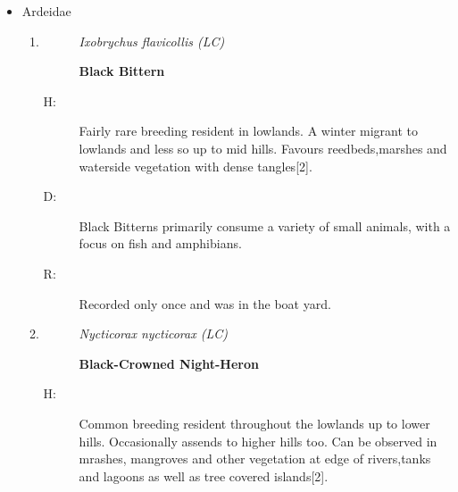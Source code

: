 \begin{itemize}
\begin{enumerate}
\begin{description}
\item[R: ]%
Surrounding woody areas of the university playground%
\end{description}%
\item%
\begin{description}%
\item[]%
\textit{ Apus affinis (LC)}%
\item[]%
\textbf{Little Swift/House Swift}%
\end{description}%
\begin{description}%
\item[H: ]%
Fairly common breeding resident rather locally from lowlands up to high hills{[}2{]}.%
\item[D: ]%
Diet mainly consists of flying insects.%
\item[R: ]%
Observed in flight near ENTC Building.%
\end{description}%
\end{enumerate}%
\item%
Ardeidae%
\begin{enumerate}%
\item%
\begin{description}%
\item[]%
\textit{Ixobrychus flavicollis (LC)}%
\item[]%
\textbf{Black Bittern}%
\end{description}%
\begin{description}%
\item[H: ]%
Fairly rare breeding resident in lowlands. A winter migrant to lowlands and less so up to mid hills. Favours reedbeds,marshes and waterside vegetation with dense tangles{[}2{]}.%
\item[D: ]%
Black Bitterns primarily consume a variety of small animals, with a focus on fish and amphibians.%
\item[R: ]%
Recorded only once and was in the boat yard.%
\end{description}%
\item%
\begin{description}%
\item[]%
\textit{Nycticorax nycticorax (LC)}%
\item[]%
\textbf{Black{-}Crowned Night{-}Heron}%
\end{description}%
\begin{description}%
\item[H: ]%
Common breeding resident throughout the lowlands  up to lower hills. Occasionally assends to higher hills too. Can be observed in mrashes, mangroves and other vegetation at edge of rivers,tanks and lagoons as well as tree covered islands{[}2{]}.%

\end{description}
\end{enumerate}
\end{itemize}
